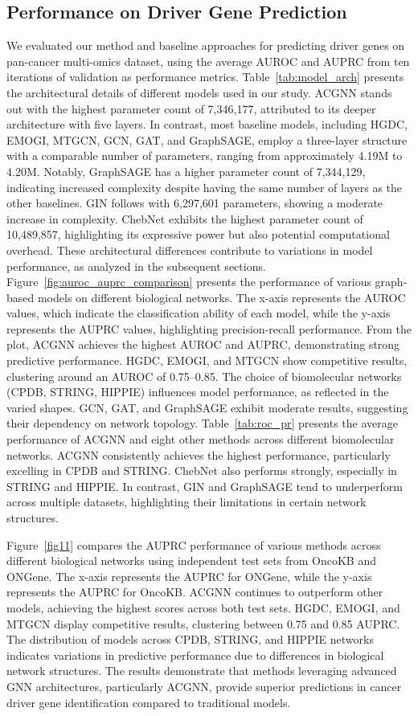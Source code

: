 \subsection{Performance on Driver Gene Prediction}
We evaluated our method and baseline approaches for predicting driver genes on pan-cancer multi-omics dataset, using the average AUROC and AUPRC from ten iterations of validation as performance metrics. \noindent Table~\ref{tab:model_arch} presents the architectural details of different models used in our study. ACGNN stands out with the highest parameter count of 7,346,177, attributed to its deeper architecture with five layers. In contrast, most baseline models, including HGDC, EMOGI, MTGCN, GCN, GAT, and GraphSAGE, employ a three-layer structure with a comparable number of parameters, ranging from approximately 4.19M to 4.20M. Notably, GraphSAGE has a higher parameter count of 7,344,129, indicating increased complexity despite having the same number of layers as the other baselines. GIN follows with 6,297,601 parameters, showing a moderate increase in complexity. ChebNet exhibits the highest parameter count of 10,489,857, highlighting its expressive power but also potential computational overhead. These architectural differences contribute to variations in model performance, as analyzed in the subsequent sections. 
Figure~\ref{fig:auroc_auprc_comparison} presents the performance of various graph-based models on different biological networks. The x-axis represents the AUROC values, which indicate the classification ability of each model, while the y-axis represents the AUPRC values, highlighting precision-recall performance.
From the plot, ACGNN achieves the highest AUROC and AUPRC, demonstrating strong predictive performance. HGDC, EMOGI, and MTGCN show competitive results, clustering around an AUROC of 0.75–0.85. The choice of biomolecular networks (CPDB, STRING, HIPPIE) influences model performance, as reflected in the varied shapes. GCN, GAT, and GraphSAGE exhibit moderate results, suggesting their dependency on network topology.
Table~\ref{tab:roc_pr} presents the average performance of ACGNN and eight other methods across different biomolecular networks. ACGNN consistently achieves the highest performance, particularly excelling in CPDB and STRING. ChebNet also performs strongly, especially in STRING and HIPPIE. In contrast, GIN and GraphSAGE tend to underperform across multiple datasets, highlighting their limitations in certain network structures.

 Figure~\ref{fig11} compares the AUPRC performance of various methods across different biological networks using independent test sets from OncoKB and ONGene. The x-axis represents the AUPRC for ONGene, while the y-axis represents the AUPRC for OncoKB. 
ACGNN continues to outperform other models, achieving the highest scores across both test sets. HGDC, EMOGI, and MTGCN display competitive results, clustering between 0.75 and 0.85 AUPRC. The distribution of models across CPDB, STRING, and HIPPIE networks indicates variations in predictive performance due to differences in biological network structures.
The results demonstrate that methods leveraging advanced GNN architectures, particularly ACGNN, provide superior predictions in cancer driver gene identification compared to traditional models.


